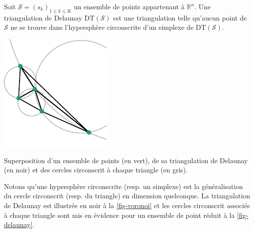         \begin{mydef}
            Soit $\mathcal{S}=(s_k)_{1\leq k\leq K}$ un ensemble de points appartenant à $\mathbb{R}^n$. Une triangulation de Delaunay $\mathrm{DT}(\mathcal{S})$ est une triangulation telle qu'aucun point de $\mathcal{S}$ ne se trouve dans l'hypersphère circonscrite d'un simplexe de $\mathrm{DT}(\mathcal{S})$.
        \end{mydef}
    \begin{marginfigure}
        \centering
        \includegraphics[]{img/chapitre2/figure3/Delaunay.pdf}
        \caption{Superposition d'un ensemble de points (en vert), de sa triangulation de Delaunay (en noir) et des cercles circonscrit à chaque triangle (en gris).}
        \label{fig-delaunay}
    \end{marginfigure}
        Notons qu'une hypersphère circonscrite (resp. un simplexe) est la généralisation du cercle circonscrit (resp. du triangle) en dimension quelconque. La triangulation de Delaunay est illustrée en noir à la \cref{fig-voronoi} et les cercles circonscrit associés à chaque triangle sont mis en évidence pour un ensemble de point réduit à la \cref{fig-delaunay}.